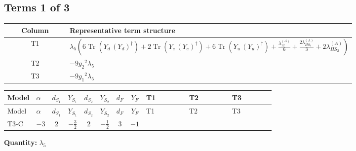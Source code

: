 \documentclass[8pt]{article}
\begin{document}
\begin{landscape}
\subsection*{Terms 1 of 3}
\begin{center}
\begin{tabular}{@{}c >{\raggedright\arraybackslash}p{0.82\linewidth}@{}}
\toprule
Column & Representative term structure \\
\midrule
T1 & \(\displaystyle {\lambda_5} \left(6 \operatorname{Tr}\!\left({Y_d}\,\left({Y_d}\right)^{\dagger}\right)+2 \operatorname{Tr}\!\left({Y_e}\,\left({Y_e}\right)^{\dagger}\right)+6 \operatorname{Tr}\!\left({Y_u}\,\left({Y_u}\right)^{\dagger}\right)+\frac{{\lambda_{12}^{(A)}}}{6}+\frac{2 {\lambda_{HS_1}^{(A)}}}{3}+2 {\lambda_{HS_2}^{(A)}}\right)\) \\
\midrule
T2 & \(\displaystyle -9 {g_2}^2 {\lambda_5}\) \\
\midrule
T3 & \(\displaystyle -9 {g_1}^2 {\lambda_5}\) \\
\midrule
\bottomrule
\end{tabular}
\end{center}
\smallskip
\tiny
\begin{longtable}{@{}llcccccc >{\raggedright\arraybackslash}p{0.21\linewidth} >{\raggedright\arraybackslash}p{0.21\linewidth} >{\raggedright\arraybackslash}p{0.21\linewidth}@{}}
\toprule
Model & $\alpha$ & $d_{S_1}$ & $Y_{S_1}$ & $d_{S_2}$ & $Y_{S_2}$ & $d_F$ & $Y_F$ & T1 & T2 & T3 \\
\midrule
\endfirsthead
\toprule
Model & $\alpha$ & $d_{S_1}$ & $Y_{S_1}$ & $d_{S_2}$ & $Y_{S_2}$ & $d_F$ & $Y_F$ & T1 & T2 & T3 \\
\midrule
\endhead
T3-C & $-3$ & $2$ & $-\frac{3}{2}$ & $2$ & $-\frac{1}{2}$ & $3$ & $-1$ & \scriptsize\adjustbox{max width=\linewidth}{$\begin{gathered} {\lambda_5} \left(6 \operatorname{Tr}\!\left({Y_d}\,\left({Y_d}\right)^{\dagger}\right)+2 \operatorname{Tr}\!\left({Y_e}\,\left({Y_e}\right)^{\dagger}\right)+6 \operatorname{Tr}\!\left({Y_u}\,\left({Y_u}\right)^{\dagger}\right)+\frac{{\lambda_{12}^{(A)}}}{6}+\frac{2 {\lambda_{HS_1}^{(A)}}}{3}+2 {\lambda_{HS_2}^{(A)}}\right)\end{gathered}$} & \scriptsize\adjustbox{max width=\linewidth}{$\begin{gathered} -9 {g_2}^2 {\lambda_5}\end{gathered}$} & \scriptsize\adjustbox{max width=\linewidth}{$\begin{gathered} -9 {g_1}^2 {\lambda_5}\end{gathered}$} \\
\midrule
\bottomrule
\end{longtable}
\clearpage
\noindent\textbf{Quantity: }$\lambda_5$\par\smallskip

\end{landscape}
\end{document}
